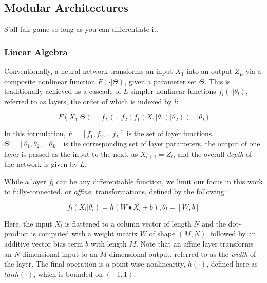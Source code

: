 \subsection{Modular Architectures}
\label{subsec:architectures}

S'all fair game so long as you can differentiate it.

\subsubsection{Linear Algebra}

Conventionally, a neural network transforms an input $X_{1}$ into an output $Z_{L}$ via a composite nonlinear function $F(\cdot \vert \Theta)$, given a parameter set $\Theta$.
This is traditionally achieved as a cascade of $L$ simpler nonlinear functions $f_l(\cdot \vert \theta_l)$, referred to as layers, the order of which is indexed by $l$:

\begin{equation}
\label{eq:layers}
F(X_{1} \vert \Theta) = f_{L}(  ... f_2(f_1(X_{1} \vert \theta_1) \vert \theta_2) ) ... \vert \theta_{L})
\end{equation}

\noindent In this formulation, $F = [f_1, f_2, ... f_{L} ]$ is the set of layer functions, $\Theta = [\theta_1, \theta_2, ... \theta_{L} ]$ is the corresponding set of layer parameters, the output of one layer is passed as the input to the next, as $X_{l+1} = Z_{l}$, and the overall \emph{depth} of the network is given by $L$.


While a layer $f_l$ can be any differentiable function, we limit our focus in this work to fully-connected, or \emph{affine}, transformations, defined by the following:

\begin{equation}
\label{eq:fclayer}
f_l(X_l \vert \theta_l) = h( W \bullet X_{l} + b), \theta_l = [W, b]
\end{equation}

\noindent Here, the input $X_l$ is flattened to a column vector of length $N$ and the dot-product is computed with a weight matrix $W$ of shape $(M, N)$, followed by an additive vector bias term $b$ with length $M$.
Note that an affine layer transforms an $N$-dimensional input to an $M$-dimensional output, referred to as the \emph{width} of the layer.
The final operation is a point-wise nonlinearity, $h(\cdot)$, defined here as $tanh(\cdot)$, which is bounded on $(-1, 1)$.

